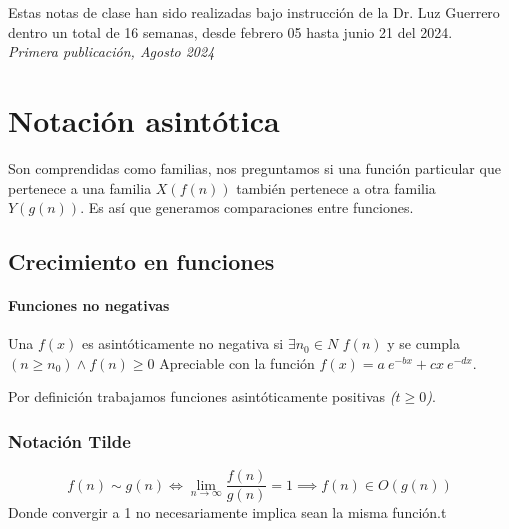 \documentclass[tikz,11pt,fleqn]{book} %
\begin{document}
\noindent Estas notas de clase han sido realizadas bajo instrucción de la Dr. Luz Guerrero dentro un total de 16 semanas, desde febrero 05 hasta junio 21 del 2024.\\ %

\noindent \textit{Primera publicación, Agosto 2024} %



\pagestyle{empty} %

\tableofcontents %


\pagestyle{fancy} %

\chapter{Notación asintótica}
Son comprendidas como familias, nos preguntamos si una función particular que pertenece a una familia $X(f(n))$ también pertenece a otra familia $Y(g(n))$. Es así que generamos comparaciones entre funciones.
\section{Crecimiento en funciones}
\subsubsection{Funciones no negativas}
Una $f(x)$ es asintóticamente no negativa si $\exists n_0\in N$ $f(n)$ y se cumpla $(n\ge n_0)\land f(n)\ge0$
Apreciable con la función $f(x)=a~e^{-bx}+cx~e^{-dx}$.

Por definición trabajamos funciones asintóticamente positivas \textit{($t\ge0$)}.

\subsection{Notación Tilde}
$$
f(n)\sim g(n)\iff\lim_{n\to\infty}\frac{f(n)}{g(n)}=1\implies f(n)\in O(g(n))
$$
Donde convergir a 1 no necesariamente implica sean la misma función.t
\end{document}
